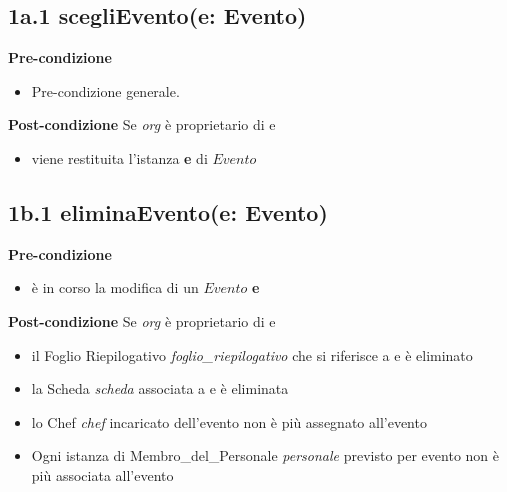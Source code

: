 \documentclass[12pt]{extarticle}
\begin{document}
\subsection*{1a.1 scegliEvento(e: Evento)}
\textbf{Pre-condizione}
\begin{itemize}
  \item Pre-condizione generale.
\end{itemize}
\textbf{Post-condizione} Se \textit{org} è proprietario di e
\begin{itemize}
   \item viene restituita l'istanza \textbf{e} di $Evento$
\end{itemize}


\subsection*{1b.1 eliminaEvento(e: Evento)}

\textbf{Pre-condizione}
\begin{itemize}
  \item è in corso la modifica di un $Evento$ \textbf{e}
\end{itemize}
\textbf{Post-condizione} Se \textit{org} è proprietario di e
\begin{itemize}
  \item il Foglio Riepilogativo \textit{foglio\_riepilogativo} che si riferisce a e è eliminato
  \item la Scheda \textit{scheda} associata a e è eliminata
  \item lo Chef \textit{chef} incaricato dell'evento non è più assegnato all'evento
  \item Ogni istanza di Membro\_del\_Personale \textit{personale} previsto per evento non è più associata all'evento
\end{itemize}
\end{document}
